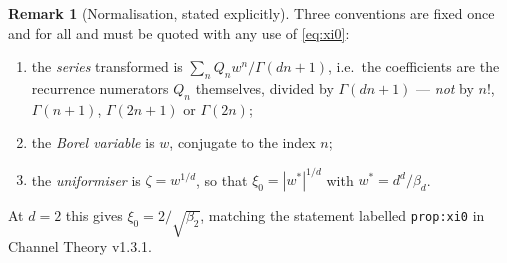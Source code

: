 \documentclass[11pt]{article}
\theoremstyle{definition}
\newtheorem{remark}[theorem]{Remark}
\newcommand{\bd}{\beta_d}
\begin{document}
\begin{remark}[Normalisation, stated explicitly]\label{rem:norm}
Three conventions are fixed once and for all and must be quoted with any use of
\eqref{eq:xi0}:
\begin{enumerate}
\item the \emph{series} transformed is $\sum_n Q_n w^n/\Gamma(dn+1)$, i.e.\ the
coefficients are the recurrence numerators $Q_n$ themselves, divided by
$\Gamma(dn+1)$ --- \emph{not} by $n!$, $\Gamma(n+1)$, $\Gamma(2n+1)$ or
$\Gamma(2n)$;
\item the \emph{Borel variable} is $w$, conjugate to the index $n$;
\item the \emph{uniformiser} is $\zeta=w^{1/d}$, so that $\xi_0=|w^*|^{1/d}$
with $w^*=d^d/\bd$.
\end{enumerate}
At $d=2$ this gives $\xi_0=2/\sqrt{\beta_2}$, matching the statement labelled
\texttt{prop:xi0} in Channel Theory v1.3.1.
\end{remark}
\end{document}

